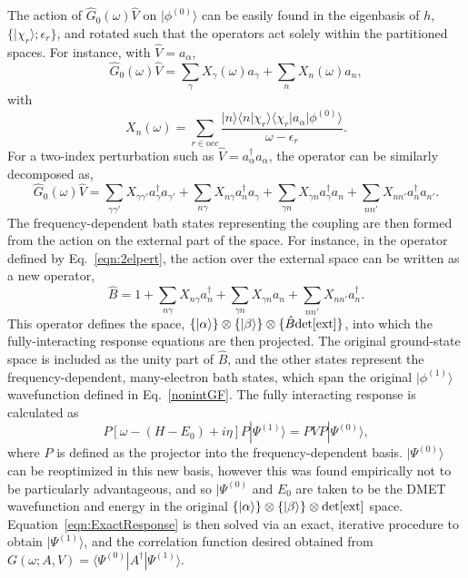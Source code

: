 \documentclass[aps,showpacs,twocolumn,nobibnotes]{revtex4}
\begin{document}
The action of ${\hat G_0}(\omega){\hat V}$ on $|\phi^{(0)} \rangle$ can be easily found in the eigenbasis of $h$, $\{ |\chi_r \rangle ; \epsilon_r \}$, and rotated such that the operators act solely 
within the partitioned spaces. For instance, with ${\hat V}=a_{\alpha}$, 
\begin{equation}
    {\hat G_0}(\omega){\hat V} = \sum_{\gamma} X_{\gamma}(\omega) a_{\gamma} + \sum_{n} X_{n}(\omega) a_n  ,
\end{equation}
with
\begin{equation}
    X_n(\omega) = \sum_{r \in {\mathrm occ}} \frac{|n \rangle \langle n|\chi_r \rangle \langle \chi_r | a_{\alpha} | \phi^{(0)} \rangle}{\omega - \epsilon_r}   .
\end{equation}
For a two-index perturbation such as ${\hat V}=a_{\alpha}^{\dagger}a_{\alpha}$, the operator can be similarly decomposed as,
\begin{equation}
    {\hat G_0}(\omega){\hat V} = \sum_{\gamma \gamma'} X_{\gamma \gamma'} a_{\gamma}^{\dagger} a_{\gamma'} + \sum_{n \gamma} X_{n \gamma} a_n^{\dagger} a_{\gamma} + \sum_{\gamma n} X_{\gamma n} a_{\gamma}^{\dagger} a_{n} + \sum_{n n'} X_{n n'} a_n^{\dagger} a_{n'}    .   \label{eqn:2elpert}
\end{equation}
The frequency-dependent bath states representing the coupling are then formed from the action on the external part of the space. For instance, in the operator defined by Eq.~\ref{eqn:2elpert}, the 
action over the external space can be written as a new operator,
\begin{equation}
    {\hat B} = 1 + \sum_{n \gamma} X_{n \gamma} a_n^{\dagger} + \sum_{\gamma n} X_{\gamma n} a_{n} + \sum_{n n'} X_{n n'} a_n^{\dagger} .
\end{equation}
This operator defines the space, $\{|\alpha \rangle \} \otimes \{ |\beta \rangle \} \otimes \{ {\hat B} \rm{det[ext]} \}$, into which the fully-interacting response equations
are then projected. 
The original ground-state space is included as the unity part of ${\hat B}$, and the other states represent the frequency-dependent, many-electron bath states,
which span the original $|\phi^{(1)} \rangle$ wavefunction defined in Eq.~\ref{nonintGF}.
The fully interacting response is calculated as
\begin{equation}
    P \left[ \omega - (H-E_0) + i \eta \right] P | \Psi^{(1)} \rangle = P V P |\Psi^{(0)} \rangle   ,   \label{eqn:ExactResponse}
\end{equation}
where $P$ is defined as the projector into the frequency-dependent basis. $|\Psi^{(0)} \rangle$ can be reoptimized in this new basis, however this was found empirically not to be particularly advantageous,
and so $|\Psi^{(0)}$ and $E_0$ are taken to be the DMET wavefunction and energy in the original $\{|\alpha \rangle \} \otimes \{ |\beta \rangle \} \otimes \rm{det[ext]} $ space. Equation~\ref{eqn:ExactResponse}
is then solved via an exact, iterative procedure to obtain $| \Psi^{(1)} \rangle$, and the correlation function desired obtained from $G(\omega;A,V)=\langle \Psi^{(0)} | A^{\dagger} | \Psi^{(1)} \rangle$.
\end{document}

